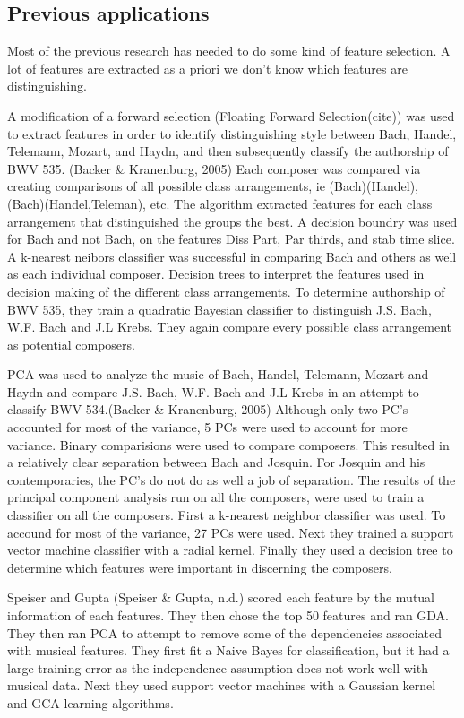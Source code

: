 \documentclass[12pt,twoside]{reedthesis}
\theoremstyle{definition}
\theoremstyle{definition}
\theoremstyle{definition}
\theoremstyle{remark}
\begin{document}
\subsection{Previous applications}\label{previous-applications}

Most of the previous research has needed to do some kind of feature
selection. A lot of features are extracted as a priori we don't know
which features are distinguishing.

A modification of a forward selection (Floating Forward Selection(cite))
was used to extract features in order to identify distinguishing style
between Bach, Handel, Telemann, Mozart, and Haydn, and then subsequently
classify the authorship of BWV 535. (Backer \& Kranenburg, 2005) Each
composer was compared via creating comparisons of all possible class
arrangements, ie (Bach)(Handel), (Bach)(Handel,Teleman), etc. The
algorithm extracted features for each class arrangement that
distinguished the groups the best. A decision boundry was used for Bach
and not Bach, on the features Diss Part, Par thirds, and stab time
slice. A k-nearest neibors classifier was successful in comparing Bach
and others as well as each individual composer. Decision trees to
interpret the features used in decision making of the different class
arrangements. To determine authorship of BWV 535, they train a quadratic
Bayesian classifier to distinguish J.S. Bach, W.F. Bach and J.L Krebs.
They again compare every possible class arrangement as potential
composers.

PCA was used to analyze the music of Bach, Handel, Telemann, Mozart and
Haydn and compare J.S. Bach, W.F. Bach and J.L Krebs in an attempt to
classify BWV 534.(Backer \& Kranenburg, 2005) Although only two PC's
accounted for most of the variance, 5 PCs were used to account for more
variance. Binary comparisions were used to compare composers. This
resulted in a relatively clear separation between Bach and Josquin. For
Josquin and his contemporaries, the PC's do not do as well a job of
separation. The results of the principal component analysis run on all
the composers, were used to train a classifier on all the composers.
First a k-nearest neighbor classifier was used. To accound for most of
the variance, 27 PCs were used. Next they trained a support vector
machine classifier with a radial kernel. Finally they used a decision
tree to determine which features were important in discerning the
composers.

Speiser and Gupta (Speiser \& Gupta, n.d.) scored each feature by the
mutual information of each features. They then chose the top 50 features
and ran GDA. They then ran PCA to attempt to remove some of the
dependencies associated with musical features. They first fit a Naive
Bayes for classification, but it had a large training error as the
independence assumption does not work well with musical data. Next they
used support vector machines with a Gaussian kernel and GCA learning
algorithms.
\end{document}
